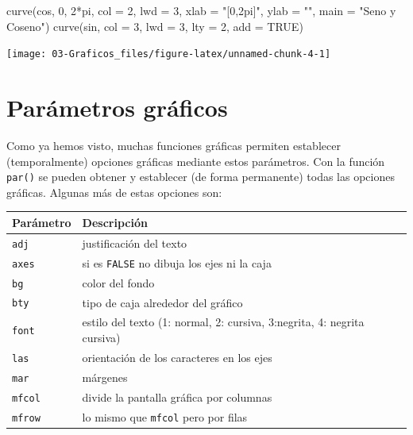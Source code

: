 \documentclass[
]{book}
\newenvironment{Shaded}{\begin{snugshade}}{\end{snugshade}}
\newcommand{\AttributeTok}[1]{\textcolor[rgb]{0.77,0.63,0.00}{#1}}
\newcommand{\ConstantTok}[1]{\textcolor[rgb]{0.00,0.00,0.00}{#1}}
\newcommand{\DecValTok}[1]{\textcolor[rgb]{0.00,0.00,0.81}{#1}}
\newcommand{\FunctionTok}[1]{\textcolor[rgb]{0.00,0.00,0.00}{#1}}
\newcommand{\NormalTok}[1]{#1}
\newcommand{\SpecialCharTok}[1]{\textcolor[rgb]{0.00,0.00,0.00}{#1}}
\newcommand{\StringTok}[1]{\textcolor[rgb]{0.31,0.60,0.02}{#1}}
\theoremstyle{break}
\theoremstyle{nonumberplain}
\begin{document}
\begin{Shaded}
\begin{Highlighting}[]
\FunctionTok{curve}\NormalTok{(cos, }\DecValTok{0}\NormalTok{, }\DecValTok{2}\SpecialCharTok{*}\NormalTok{pi, }\AttributeTok{col =} \DecValTok{2}\NormalTok{, }\AttributeTok{lwd =} \DecValTok{3}\NormalTok{, }
      \AttributeTok{xlab =} \StringTok{"[0,2pi]"}\NormalTok{, }\AttributeTok{ylab =} \StringTok{""}\NormalTok{, }\AttributeTok{main =} \StringTok{"Seno y Coseno"}\NormalTok{)}
\FunctionTok{curve}\NormalTok{(sin, }\AttributeTok{col =} \DecValTok{3}\NormalTok{, }\AttributeTok{lwd =} \DecValTok{3}\NormalTok{, }\AttributeTok{lty =} \DecValTok{2}\NormalTok{, }\AttributeTok{add =} \ConstantTok{TRUE}\NormalTok{)}
\end{Highlighting}
\end{Shaded}

\begin{center}\texttt{[image: 03-Graficos\_files/figure-latex/unnamed-chunk-4-1]} \end{center}

\hypertarget{bajo-nivel-plot}{%
\section{Parámetros gráficos}\label{bajo-nivel-plot}}

Como ya hemos visto, muchas funciones gráficas permiten establecer (temporalmente) opciones gráficas mediante estos parámetros.
Con la función \texttt{par()} se pueden obtener y establecer (de forma permanente) todas las opciones gráficas.
Algunas más de estas opciones son:

\begin{longtable}[]{@{}
  >{\raggedright\arraybackslash}p{}
  >{\raggedright\arraybackslash}p{}@{}}
\toprule
Parámetro & Descripción \\
\midrule
\endhead
\texttt{adj} & justificación del texto \\
\texttt{axes} & si es \texttt{FALSE} no dibuja los ejes ni la caja \\
\texttt{bg} & color del fondo \\
\texttt{bty} & tipo de caja alrededor del gráfico \\
\texttt{font} & estilo del texto
(1: normal, 2: cursiva, 3:negrita, 4: negrita cursiva) \\
\texttt{las} & orientación de los caracteres en los ejes \\
\texttt{mar} & márgenes \\
\texttt{mfcol} & divide la pantalla gráfica por columnas \\
\texttt{mfrow} & lo mismo que \texttt{mfcol} pero por filas \\
\bottomrule
\end{longtable}
\end{document}
